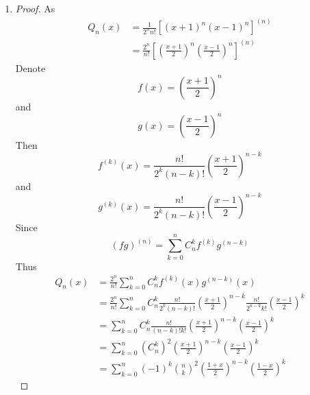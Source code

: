 \documentclass[paper=a4, fontsize=11pt]{scrartcl} %
\numberwithin{equation}{section} %
\numberwithin{figure}{section} %
\numberwithin{table}{section} %
\begin{document}
\begin{enumerate}
		\item
			\begin{proof}
				As 
				\begin{equation}
					\begin{aligned}
						Q_n(x) & = \frac{1}{2^n n!}[(x+1)^n(x-1)^n]^{(n)} \\
							   & = \frac{2^n}{n!}[(\frac{x+1}{2})^n(\frac{x-1}{2})^n]^{(n)}
					\end{aligned}
				\end{equation}
				Denote
				\begin{equation}
					f(x) = (\frac{x+1}{2})^n
				\end{equation}
				and
				\begin{equation}
					g(x) = (\frac{x-1}{2})^n
				\end{equation}
				Then
				\begin{equation}
					f^{(k)}(x) = \frac{n!}{2^k (n-k)!} (\frac{x+1}{2})^{n-k}
				\end{equation}
				and
				\begin{equation}
					g^{(k)}(x) = \frac{n!}{2^k (n-k)!} (\frac{x-1}{2})^{n-k}
				\end{equation}
				Since
				\begin{equation}
					(fg)^{(n)} = \sum_{k=0}^{n} C_n^k f^{(k)}g^{(n-k)}
				\end{equation}
				Thus
				\begin{equation}
					\begin{aligned}
						Q_n(x) & = \frac{2^n}{n!} \sum_{k=0}^{n} C_n^k f^{(k)}(x) g^{(n-k)}(x)\\
							   & = \frac{2^n}{n!} \sum_{k=0}^{n} C_n^k \frac{n!}{2^k (n-k)!} (\frac{x+1}{2})^{n-k} \frac{n!}{2^{n-k} k!} (\frac{x-1}{2})^k \\
							   & = \sum_{k=0}^{n} C_n^k \frac{n!}{(n-k)!k!} (\frac{x+1}{2})^{n-k} (\frac{x-1}{2})^k\\
							   & = \sum_{k=0}^{n} (C_n^k)^2 (\frac{x+1}{2})^{n-k} (\frac{x-1}{2})^k\\
							   &= \sum_{k=0}^{n} (-1)^k \binom{n}{k}^2 (\frac{1+x}{2})^{n-k} (\frac{1-x}{2})^k
					\end{aligned}
				\end{equation}
			\end{proof}
	
	\end{enumerate}

\end{document}
